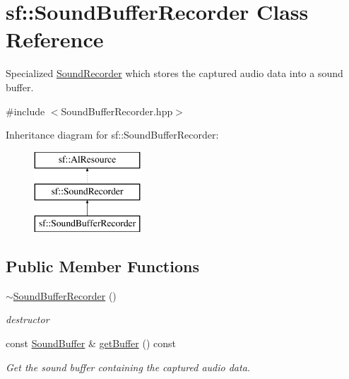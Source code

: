 \hypertarget{classsf_1_1_sound_buffer_recorder}{}\section{sf\+:\+:Sound\+Buffer\+Recorder Class Reference}
\label{classsf_1_1_sound_buffer_recorder}


Specialized \hyperlink{classsf_1_1_sound_recorder}{Sound\+Recorder} which stores the captured audio data into a sound buffer.  




{\ttfamily \#include $<$Sound\+Buffer\+Recorder.\+hpp$>$}

Inheritance diagram for sf\+:\+:Sound\+Buffer\+Recorder\+:\begin{figure}[H]
\begin{center}
\leavevmode
\includegraphics[height=3.000000cm]{classsf_1_1_sound_buffer_recorder}
\end{center}
\end{figure}
\subsection*{Public Member Functions}
\begin{DoxyCompactItemize}
\item 
\mbox{\label{classsf_1_1_sound_buffer_recorder_a350f7f885ccfd12b4c6c120c23695637}} 
\hyperlink{classsf_1_1_sound_buffer_recorder_a350f7f885ccfd12b4c6c120c23695637}{$\sim$\+Sound\+Buffer\+Recorder} ()
\begin{DoxyCompactList}\small\item\em destructor \end{DoxyCompactList}\item 
const \hyperlink{classsf_1_1_sound_buffer}{Sound\+Buffer} \& \hyperlink{classsf_1_1_sound_buffer_recorder_aa3a8d7a612cb885ed2f58bb86aa24acb}{get\+Buffer} () const
\begin{DoxyCompactList}\small\item\em Get the sound buffer containing the captured audio data. \end{DoxyCompactList}\end{DoxyCompactItemize}
